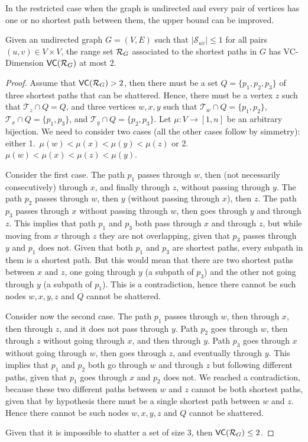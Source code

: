 In the restricted case when the graph is undirected and every pair of vertices
has one or no shortest path between them, the upper bound can be improved.
\begin{lemma}\label{lem:vcdimuppboundunique}
  Given an undirected graph $G=(V,E)$ such that $|\mathcal{S}_{uv}|\le1$ for all
  pairs $(u,v)\in V\times V$, the range set $\mathcal{R}_G$ associated to the
  shortest paths in $G$ has VC-Dimension $\mathsf{VC}(\mathcal{R}_G)$ at most $2$.
\end{lemma}

\begin{proof}
  Assume that $\mathsf{VC}(\mathcal{R}_G)>2$, then there must be a set $Q=\{p_1,p_2,p_3\}$ of three
  shortest paths that can be shattered. Hence, there must be a vertex $z$ such that
  $\mathcal{T}_{z}\cap Q=Q$, and three vertices $w,x,y$ such
  that $\mathcal{T}_{w}\cap Q=\{p_1,p_2\}$, $\mathcal{T}_{x}\cap
  Q=\{p_1,p_3\}$, and $\mathcal{T}_{y}\cap Q=\{p_2,p_3\}$. Let $\mu:V\rightarrow
  [1,n]$ be an arbitrary bijection. We need to consider two
  cases (all the other cases follow by simmetry): either
  1.~$\mu(w)<\mu(x)<\mu(y)<\mu(z)$ or 2.~$\mu(w)<\mu(x)<\mu(z)<\mu(y)$.

  Consider the first case. The path $p_1$ passes through $w$, then (not
  necessarily consecutively) through $x$, and finally through $z$, without
  passing through $y$. The path $p_2$ passes through $w$, then $y$ (without
  passing through $x$), then $z$. The path $p_3$ passes through $x$ without
  passing through $w$, then goes through $y$ and through $z$. This implies that
  path $p_1$ and $p_3$ both pass through $x$ and through $z$, but while moving
  from $x$ through $z$ they are not overlapping, given that $p_3$ passes through
  $y$ and $p_1$ does not. Given that both $p_1$ and $p_3$ are shortest
  paths, every subpath in them is a shortest path. But this would mean that
  there are two shortest paths between $x$ and $z$, one going through $y$
  (a subpath of $p_3$) and the other not going through $y$ (a subpath of $p_1$).
  This is a contradiction, hence there cannot be such nodes $w,x,y,z$ and $Q$
  cannot be shattered.

  Consider now the second case. The path $p_1$ passes through $w$, then through
  $x$, then through $z$, and it does not pass through $y$. Path $p_2$ goes
  through $w$, then through $z$ without going through $x$, and then through $y$.
  Path $p_3$ goes through $x$ without going through $w$, then goes through $z$,
  and eventually through $y$. This implies that $p_1$ and $p_2$ both go through
  $w$ and through $z$ but following different paths, given that $p_1$ goes
  through $x$ and $p_2$ does not. We reached a contradiction, because these
  two different paths between $w$ and $z$ cannot be both shortest paths, given
  that by hypothesis there must be a single shortest path between $w$ and $z$.
  Hence there cannot be such nodes $w,x,y,z$ and $Q$ cannot be shattered.  

  Given that it is impossible to shatter a set of size $3$, then
  $\mathsf{VC}(\mathcal{R}_G)\le 2$.
\end{proof}

